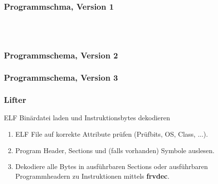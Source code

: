 \begin{frame}
    \frametitle{Programmschma, Version 1}
    ~\\
    ~\\
\end{frame}

\begin{frame}
    \frametitle{Programmschema, Version 2}
\end{frame}

\begin{frame}
    \frametitle{Programmschema, Version 3}
\end{frame}


\begin{frame}
    \frametitle{Lifter}{ELF Binärdatei laden und Instruktionsbytes dekodieren}

    \begin{enumerate}
        \item ELF File auf korrekte Attribute prüfen (Prüfbits, OS, Class, ...).
        \item Program Header, Sections und (falls vorhanden) Symbole auslesen.
        \item Dekodiere alle Bytes in ausführbaren Sections oder ausführbaren Programmheadern zu Instruktionen mittels \textbf{frvdec}.
    \end{enumerate}
\end{frame}
\clearpage


